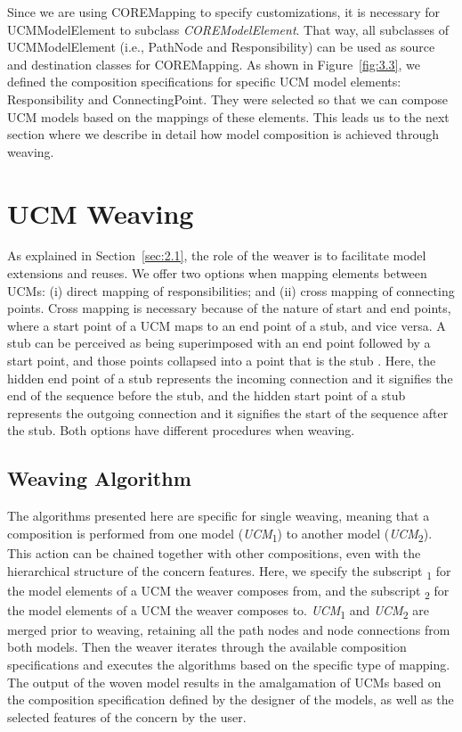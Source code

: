 Since we are using {\cls COREMapping} to specify customizations, it is necessary for {\cls UCMModelElement} to subclass \emph{\cls COREModelElement}. That way, all subclasses of {\cls UCMModelElement} (i.e., {\cls PathNode} and {\cls Responsibility}) can be used as source and destination classes for {\cls COREMapping}. As shown in Figure~\ref{fig:3.3}, we defined the composition specifications for specific UCM model elements: {\cls Responsibility} and {\cls ConnectingPoint}. They were selected so that we can compose UCM models based on the mappings of these elements. This leads us to the next section where we describe in detail how model composition is achieved through weaving.


\section{UCM Weaving} \label{sec:3.2}

As explained in Section~\ref{sec:2.1}, the role of the weaver is to facilitate model extensions and reuses. We offer two options when mapping elements between UCMs: (i) direct mapping of responsibilities; and (ii) cross mapping of connecting points. Cross mapping is necessary because of the nature of start and end points, where a start point of a UCM maps to an end point of a stub, and vice versa. A stub can be perceived as being superimposed with an end point followed by a start point, and those points collapsed into a point that is the stub \cite{buhr1995use}. Here, the hidden end point of a stub represents the incoming connection and it signifies the end of the sequence before the stub, and the hidden start point of a stub represents the outgoing connection and it signifies the start of the sequence after the stub. Both options have different procedures when weaving.

\subsection{Weaving Algorithm}

The algorithms presented here are specific for single weaving, meaning that a composition is performed from one model (\emph{UCM}\textsubscript{1}) to another model (\emph{UCM}\textsubscript{2}). This action can be chained together with other compositions, even with the hierarchical structure of the concern features. Here, we specify the subscript \textsubscript{1} for the model elements of a UCM the weaver composes from, and the subscript \textsubscript{2} for the model elements of a UCM the weaver composes to. \emph{UCM}\textsubscript{1} and \emph{UCM}\textsubscript{2} are merged prior to weaving, retaining all the path nodes and node connections from both models. Then the weaver iterates through the available composition specifications and executes the algorithms based on the specific type of mapping. The output of the woven model results in the amalgamation of UCMs based on the composition specification defined by the designer of the models, as well as the selected features of the concern by the user.

